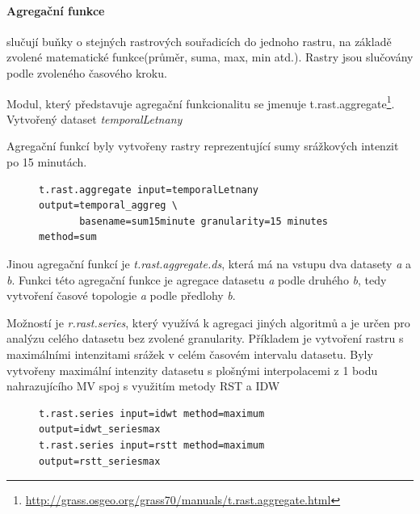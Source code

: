 \documentclass[a4paper,12pt,oneside]{report}
\begin{document}
\paragraph{Agregační funkce} slučují buňky o stejných rastrových souřadicích do jednoho rastru, na základě zvolené matematické funkce(průměr, suma, max, min atd.). Rastry jsou slučovány podle zvoleného časového kroku.

Modul, který představuje agregační funkcionalitu se jmenuje t.rast.aggregate\footnote{\url{http://grass.osgeo.org/grass70/manuals/t.rast.aggregate.html}}.  Vytvořený dataset \emph{temporalLetnany}

Agregační funkcí byly vytvořeny rastry reprezentující sumy srážkových intenzit po 15 minutách.
\begin{figure}[h!]
\begin{footnotesize}
\lstset{extendedchars=false,
escapeinside=''}
\begin{lstlisting}[style=mybash]
t.rast.aggregate input=temporalLetnany output=temporal_aggreg \
       basename=sum15minute granularity=15 minutes method=sum
\end{lstlisting}
\end{footnotesize} 
\end{figure}
Jinou agregační funkcí je \textit{t.rast.aggregate.ds}, která má na vstupu dva datasety \emph{a} a \emph{b}. Funkci této agregační funkce je agregace  datasetu \emph{a} podle druhého\emph{ b}, tedy vytvoření časové topologie \emph{a} podle předlohy \emph{b}.



Možností je \textit{r.rast.series}, který využívá k agregaci jiných algoritmů a je určen pro analýzu celého datasetu bez zvolené granularity.
Příkladem je vytvoření rastru s maximálními intenzitami srážek v celém časovém intervalu datasetu. Byly vytvořeny maximální intenzity datasetu s plošnými interpolacemi z 1 bodu nahrazujícího MV spoj s využitím metody RST a IDW


\begin{figure}[h!]
\begin{footnotesize}
\lstset{extendedchars=false,
escapeinside=''}
\begin{lstlisting}[style=mybash]
t.rast.series input=idwt method=maximum output=idwt_seriesmax           
t.rast.series input=rstt method=maximum output=rstt_seriesmax    
\end{lstlisting}
\end{footnotesize} 
\end{figure}
\end{document}
